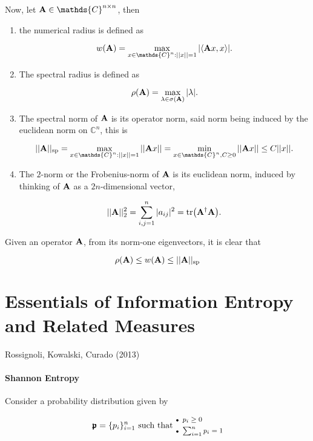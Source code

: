 \documentclass{homework}
\begin{document}
Now, let ${\bf A} \in \mathds{C}^{n \times n}$, then

\begin{enumerate}
    \item the numerical radius is defined as 
    
    $$
    w({\bf A}) = \max_{x \in \mathds{C}^n : ||x|| = 1} |\langle {\bf A} x, x \rangle|.
    $$
    
    \item The spectral radius is defined as 
    
    $$
    \rho({\bf {A}}) = \max_{\lambda \in \sigma({\bf A})} |\lambda|.
    $$
    
    \item The spectral norm of ${\bf A}$ is its operator norm, said norm being induced by the euclidean norm on $\mathds{C}^{n}$, this is 
    
    $$
    ||{\bf A}||_{\textnormal{sp}} =  \max_{x \in \mathds{C}^n : ||x|| = 1} ||{\bf A}x|| = \min_{x \in \mathds{C}^n, C \geq 0} ||{\bf A}x|| \leq C||x||.
    $$
    
    \item The $2$-norm or the Frobenius-norm of ${\bf A}$ is its euclidean norm, induced by thinking of ${\bf A}$ as a $2n$-dimensional vector, 
    
    $$
    ||{\bf A}||_2^2 = \sum_{i,j=1}^{n} |a_{ij}|^2 = \tr({\bf A}^\dagger {\bf A}).
    $$
\end{enumerate}

Given an operator ${\bf A}$, from its norm-one eigenvectors, it is clear that 

$$
\rho({\bf A}) \leq w({\bf A}) \leq ||{\bf A}||_{\textnormal{sp}}
$$

\clearpage

\section{Essentials of Information Entropy and Related Measures}

Rossignoli, Kowalski, Curado (2013) \\

\paragraph{\textbf{Shannon Entropy}}

Consider a probability distribution given by 

\begin{equation}
    \bm{\mathfrak{p}} = \{p_i\}_{i=1}^{n} \textnormal{ such that }  \begin{medsize}\begin{array}{@{\mathsmaller{\bullet}\enspace}l@{}}
    p_i \geq 0 \\[1ex]
    \sum_{i=1}^{n} p_i = 1 
    \end{array}\end{medsize}
\end{equation}
\end{document}
